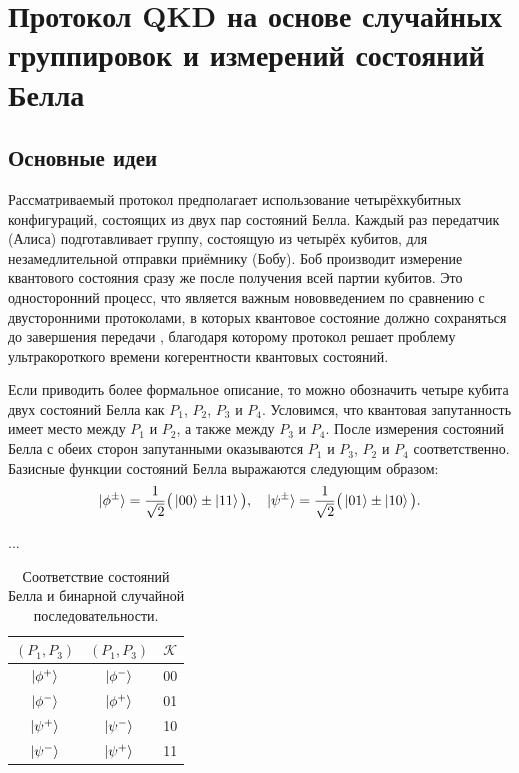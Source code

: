 \documentclass[a4paper,11pt]{article}
\begin{document}
\section{Протокол QKD на основе случайных группировок и измерений состояний Белла}\label{proto}

\subsection{Основные идеи}
Рассматриваемый протокол предполагает использование четырёхкубитных конфигураций, состоящих из двух пар состояний Белла. Каждый раз передатчик (Алиса) подготавливает группу, состоящую из четырёх кубитов, для незамедлительной отправки приёмнику (Бобу). Боб производит измерение квантового состояния сразу же после получения всей партии кубитов. Это односторонний процесс, что является важным нововведением по сравнению с двусторонними протоколами, в которых квантовое состояние должно сохраняться до завершения передачи \cite{Gao,nine}, благодаря которому протокол решает проблему ультракороткого времени когерентности квантовых состояний.

Если приводить более формальное описание, то можно обозначить четыре кубита двух состояний Белла как $P_1$, $P_2$, $P_3$ и $P_4$. Условимся, что квантовая запутанность имеет место между $P_1$ и $P_2$, а также между $P_3$ и $P_4$. После измерения состояний Белла с обеих сторон запутанными оказываются $P_1$ и $P_3$, $P_2$ и $P_4$ соответственно. Базисные функции состояний Белла выражаются следующим образом:
\begin{equation*}
\ket{\phi^{\pm}} = \dfrac{1}{\sqrt2}\big(\ket{00} \pm \ket{11} \big), \quad
\ket{\psi^{\pm}} = \dfrac{1}{\sqrt2}\big(\ket{01} \pm \ket{10} \big).
\end{equation*}


\iffalse ... 
\begin{table}
	\centering
	\caption{\label{tab:1}Соответствие состояний Белла и бинарной случайной последовательности.}
	\begin{tabular}{ |c||c||c| }
		\hline
		$(P_1, P_3)$ & $(P_1, P_3)$ & $\mathcal{K}$ \\ \hline
		$\ket{\phi^+}$ & $\ket{\phi^-}$ & 00 \\ 
		$\ket{\phi^-}$ & $\ket{\phi^+}$ & 01 \\ 
		$\ket{\psi^+}$ & $\ket{\psi^-}$ & 10 \\ 
		$\ket{\psi^-}$ & $\ket{\psi^+}$ & 11 \\ 
		\hline
	\end{tabular}
\end{table}
\end{document}
